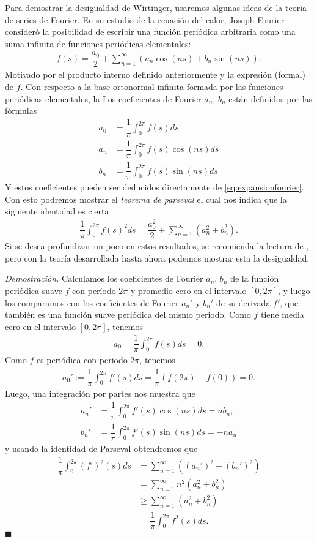\documentclass[oneside,11pt]{memoir}
\begin{document}
Para demostrar la desigualdad de Wirtinger, usaremos algunas ideas de la teoría de series de Fourier. En su estudio de la ecuación del calor, Joseph Fourier consideró la posibilidad de escribir una función periódica arbitraria como una suma infinita de funciones periódicas elementales:
\begin{align}
    f(s)=\dfrac{a_0}{2}+\sum_{n=1}^{\infty}(a_n\cos(ns)+b_n\sin(ns)).
    \label{eq:expansionfourier}
\end{align}
Motivado por el producto interno definido anteriormente y la expresión (formal) de $f$. Con respecto a la base ortonormal infinita formada por las funciones periódicas elementales, la Los coeficientes de Fourier $a_n$, $b_n$ están definidos por las fórmulas
\begin{align*}
    a_0&=\dfrac{1}{\pi}\int_0^{2\pi}f(s)ds\\
    a_n&=\dfrac{1}{\pi}\int_0^{2\pi}f(s)\cos(ns)ds\\
    b_n&=\dfrac{1}{\pi}\int_0^{2\pi}f(s)\sin(ns)ds
\end{align*}
Y estos coeficientes pueden ser deducidos directamente de \ref{eq:expansionfourier}. Con esto podremos mostrar el \textit{teorema de parseval} el cual nos indica que la siguiente identidad es cierta
\begin{align*}
    \dfrac{1}{\pi}\int_{0}^{2\pi}f(s)^2ds=\dfrac{a_0^2}{2}+\sum_{n=1}^{\infty}(a_n^2+b_n^2).
\end{align*}
Si se desea profundizar un poco en estos resultados, se recomienda la lectura de \cite{stein2011fourier}, pero con la teoría desarrollada hasta ahora podemos mostrar esta la desigualdad.

\textit{Demostración. }Calculamos los coeficientes de Fourier $a_n$, $b_n$ de la función periódica suave $f$ con período $2\pi$ y promedio cero en el intervalo $[0,2\pi]$, y luego los comparamos con los coeficientes de
Fourier $a_n'$ y $b_n'$ de su derivada $f'$, que también es una función suave periódica del mismo periodo. Como $f$ tiene media cero en el intervalo $[0,2\pi]$, tenemos
\begin{align*}
    a_0=\dfrac{1}{\pi}\int_{0}^{2\pi}f(s)ds=0.
\end{align*}
Como $f$ es periódica con periodo $2\pi$, tenemos
\begin{align*}
    a_0':=\dfrac{1}{\pi}\int_{0}^{2\pi}f'(s)ds=\dfrac{1}{\pi}(f(2\pi)-f(0))=0.
\end{align*}
Luego, una integración por partes nos muestra que
\begin{align*}
   a_n'&=\dfrac{1}{\pi}\int_0^{2\pi}f'(s)\cos(ns)ds=nb_n,\\
    b_n'&=\dfrac{1}{\pi}\int_0^{2\pi}f'(s)\sin(ns)ds =-na_n
\end{align*}
y usando la identidad de Parseval obtendremos que
\begin{align*}
    \dfrac{1}{\pi}\int_{0}^{2\pi}(f')^2(s)ds&=\sum_{n=1}^\infty((a_n')^2+(b_n')^2)\\
    &=\sum_{n=1}^{\infty}n^2(a_n^2+b_n^2)\\
    &\geq\sum_{n=1}^{\infty}(a_n^2+b_n^2)\\
    &=\dfrac{1}{\pi}\int_{0}^{2\pi}f^2(s)ds.
\end{align*}
\hfill $\blacksquare$
\end{document}
